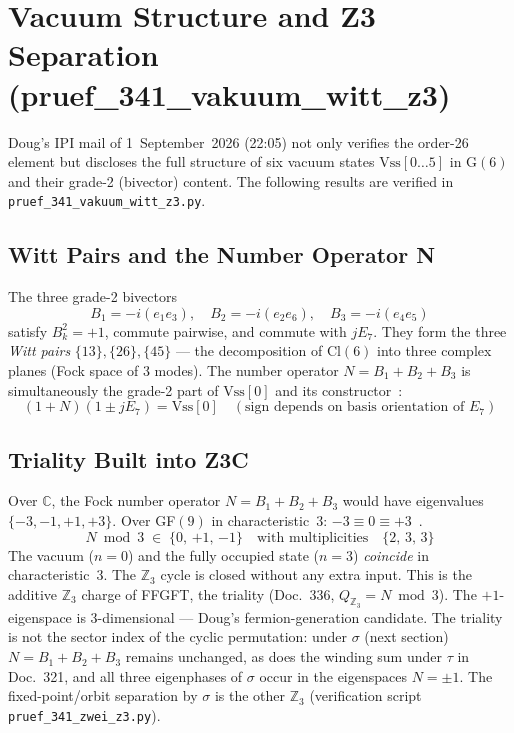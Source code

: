 \section{Vacuum Structure and Z3 Separation (pruef\_341\_vakuum\_witt\_z3)}

Doug's IPI mail of 1~September~2026 (22:05) not only verifies the
order-26 element but discloses the full structure of six vacuum states
$\text{Vss}[0\ldots5]$ in G$(6)$ and their grade-2 (bivector) content.
The following results are verified in \texttt{pruef\_341\_vakuum\_witt\_z3.py}.

\subsection{Witt Pairs and the Number Operator N}

The three grade-2 bivectors
\begin{equation}
  B_1 = -i(e_1 e_3),\quad B_2 = -i(e_2 e_6),\quad B_3 = -i(e_4 e_5)
\end{equation}
satisfy $B_k^2 = +1$, commute pairwise, and commute with $jE_7$.
They form the three \emph{Witt pairs} $\{13\},\{26\},\{45\}$ ---
the decomposition of Cl$(6)$ into three complex planes (Fock space of 3 modes).
The number operator $N = B_1 + B_2 + B_3$ is simultaneously
the grade-2 part of $\text{Vss}[0]$ and its constructor~\BM:
\begin{equation}
  (1+N)(1 \pm jE_7) = \text{Vss}[0]
  \quad (\text{sign depends on basis orientation of } E_7)
\end{equation}

\subsection{Triality Built into Z3C}

Over $\mathbb{C}$, the Fock number operator $N = B_1+B_2+B_3$ would have
eigenvalues $\{-3,-1,+1,+3\}$.
Over GF$(9)$ in characteristic~3: $-3 \equiv 0 \equiv +3$~\BM.
\begin{equation}
  N \bmod 3 \;\in\; \{0,\,{+1},\,{-1}\}
  \quad\text{with multiplicities}\quad \{2,\,3,\,3\}
\end{equation}
The vacuum ($n=0$) and the fully occupied state ($n=3$) \emph{coincide} in
characteristic~3. The $\mathbb{Z}_3$ cycle is closed without any extra input.
This is the additive $\mathbb{Z}_3$ charge of FFGFT, the triality
(Doc.~336, $Q_{\mathbb{Z}_3} = N \bmod 3$). The $+1$-eigenspace is 3-dimensional ---
Doug's fermion-generation candidate.
The triality is not the sector index of the cyclic permutation: under $\sigma$
(next section) $N=B_1+B_2+B_3$ remains unchanged, as does the winding sum under $\tau$
in Doc.~321, and all three eigenphases of $\sigma$ occur in the eigenspaces $N=\pm1$.
The fixed-point/orbit separation by $\sigma$ is the other $\mathbb{Z}_3$
(verification script \texttt{pruef\_341\_zwei\_z3.py}).

